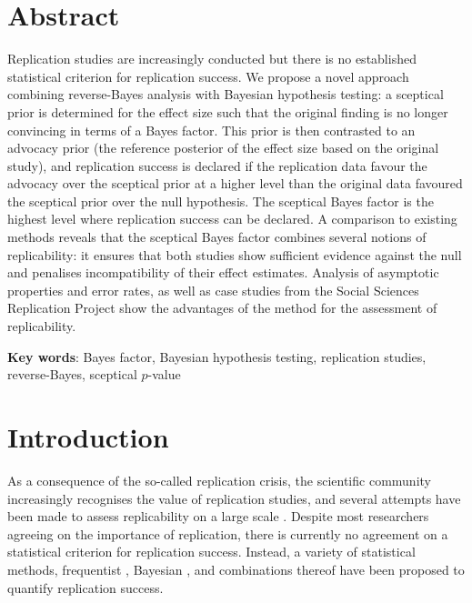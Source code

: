 \section*{Abstract}

Replication studies are increasingly conducted but there is no established
statistical criterion for replication success. We propose a novel approach
combining reverse-Bayes analysis with Bayesian hypothesis testing: a sceptical
prior is determined for the effect size such that the original finding is no
longer convincing in terms of a Bayes factor. This prior is then contrasted to
an advocacy prior (the reference posterior of the effect size based on the
original study), and replication success is declared if the replication data
favour the advocacy over the sceptical prior at a higher level than the original
data favoured the sceptical prior over the null hypothesis. The sceptical Bayes
factor is the highest level where replication success can be declared. A
comparison to existing methods reveals that the sceptical Bayes factor combines
several notions of replicability: it ensures that both studies show sufficient
evidence against the null and penalises incompatibility of their effect
estimates. Analysis of asymptotic properties and error rates, as well as case
studies from the Social Sciences Replication Project show the advantages of the
method for the assessment of replicability.

\textbf{Key words}:
Bayes factor, Bayesian hypothesis testing, replication studies, reverse-Bayes,
sceptical $p$-value

\section{Introduction}
As a consequence of the so-called replication crisis, the scientific community
increasingly recognises the value of replication studies, and several attempts
have been made to assess replicability on a large scale \citep{Errington2014,
Klein2014, Opensc2015, Camerer2016, Camerer2018, Cova2018}. Despite most
researchers agreeing on the importance of replication, there is currently no
agreement on a statistical criterion for replication success. Instead, a variety
of statistical methods, frequentist \citep{Simonsohn2015, Patil2016, Hedges2019,
Mathur2020}, Bayesian \citep{Bayarri2002b, Bayarri2002, Verhagen2014,
Johnson2016, Etz2016, vanAert2017, Ly2018, Harms2019}, and combinations thereof
\citep{Held2020, Pawel2020, Held2021} have been proposed to quantify replication
success.

